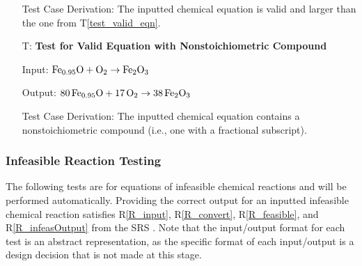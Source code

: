 \documentclass[12pt, titlepage]{article}
\newcounter{testnum} %
\newcommand{\testref}[1]{T\ref{#1}}
\newcommand{\rref}[1]{R\ref{#1}}
\begin{document}
\begin{enumerate}
    Test Case Derivation: The inputted chemical equation is
    valid and larger than the one from \testref{test_valid_eqn}.

  \item[T\refstepcounter{testnum}\thetestnum \label{test_nonstoich_valid_eqn}:]
    \textbf{Test for Valid Equation with Nonstoichiometric Compound}

    Input: $\ce{Fe_{0.95}O} + \ce{O2} \rightarrow \ce{Fe2O3}$
    \cite{doubtnut_when_nodate}

    Output: $\ce{80Fe_{0.95}O} + \ce{17O2} \rightarrow \ce{38Fe2O3}$

    Test Case Derivation: The inputted chemical equation contains a
    nonstoichiometric compound (i.e., one with a fractional subscript).

\end{enumerate}

\subsubsection{Infeasible Reaction Testing}

The following tests are for equations of infeasible chemical reactions and
will be performed automatically. Providing the correct output for an inputted
infeasible chemical reaction satisfies \rref{R_input}, \rref{R_convert},
\rref{R_feasible}, and \rref{R_infeasOutput} from the SRS \cite{srs}.
Note that the input/output format
for each test is an abstract representation, as the specific format of each
input/output is a design decision that is not made at this stage.
\end{document}
